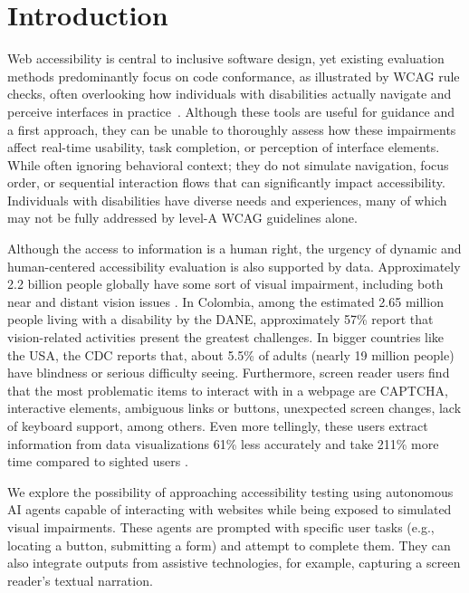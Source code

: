 \section{Introduction}

Web accessibility is central to inclusive software design, yet existing evaluation methods predominantly focus on code conformance, as illustrated by \ac{WCAG} rule checks, often overlooking how individuals with disabilities actually navigate and perceive interfaces in practice~\cite{ara2024inclusive}. Although these tools are useful for guidance and a first approach, they can be unable to thoroughly assess how these impairments affect real-time usability, task completion, or perception of interface elements. While often ignoring behavioral context; they do not simulate navigation, focus order, or sequential interaction flows that can significantly impact accessibility. Individuals with disabilities have diverse needs and experiences, many of which may not be fully addressed by level-A \ac{WCAG} guidelines alone.

Although the access to information is a human right, the urgency of dynamic and human-centered accessibility evaluation is also supported by data. Approximately 2.2 billion people globally have some sort of visual impairment, including both near and distant vision issues \cite{who2023vision}. In Colombia, among the estimated 2.65 million people living with a disability by the DANE, approximately 57\% report that vision-related activities present the greatest challenges\cite{DANE2022}. In bigger countries like the USA, the CDC reports that, about 5.5\% of adults (nearly 19 million people) have blindness or serious difficulty seeing\cite{cdc2025disabilities}. Furthermore, screen reader users find that the most problematic items to interact with in a webpage are CAPTCHA, interactive elements, ambiguous links or buttons, unexpected screen changes, lack of keyboard support, among others\cite{webaimsurvey2025}. Even more tellingly, these users extract information from data visualizations 61\% less accurately and take 211\% more time compared to sighted users \cite{wobbrock2021assets}.

We explore the possibility of approaching accessibility testing using autonomous \ac{AI} agents capable of interacting with websites while being exposed to simulated visual impairments. These agents are prompted with specific user tasks (e.g., locating a button, submitting a form) and attempt to complete them. They can also integrate outputs from assistive technologies, for example, capturing a screen reader's textual narration. 

